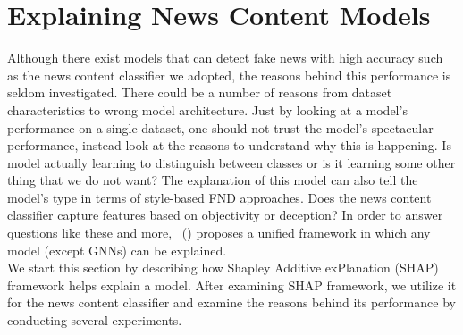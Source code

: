 \section{Explaining News Content Models}
\label{sec:ExplainingNewsContentModels}
Although there exist models that can detect fake news with high accuracy such as the news content classifier we adopted, the reasons behind this performance is seldom investigated. There could be a number of reasons from dataset characteristics to wrong model architecture. Just by looking at a model's performance on a single dataset, one should not trust the model's spectacular performance, instead look at the reasons to understand why this is happening. Is model actually learning to distinguish between classes or is it learning some other thing that we do not want? The explanation of this model can also tell the model's type in terms of style-based FND approaches. Does the news content classifier capture features based on objectivity or deception? In order to answer questions like these and more,~\cite{AUnifiedApproach_Lundberg} (\citeyear{AUnifiedApproach_Lundberg}) proposes a unified framework in which any model (except GNNs) can be explained.\\
We start this section by describing how Shapley Additive exPlanation (SHAP) framework helps explain a model. After examining SHAP framework, we utilize it for the news content classifier and examine the reasons behind its performance by conducting several experiments.\\
